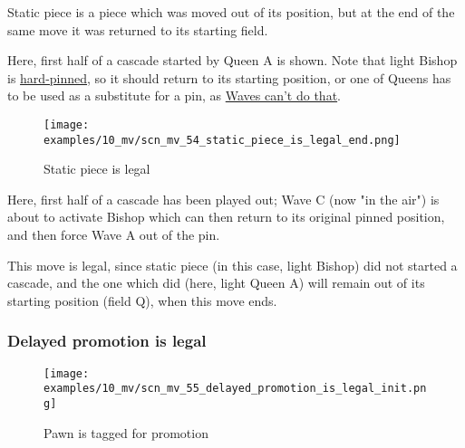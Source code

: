 \vspace*{-0.4\baselineskip}
Static piece is a piece which was moved out of its position, but at the end of the
same move it was returned to its starting field.

Here, first half of a cascade started by Queen A is shown. Note that light Bishop
is \href{https://en.wikipedia.org/wiki/Pin_(chess)#Absolute_pin}{hard-pinned}, so
it should return to its starting position, or one of Queens has to be used as a
substitute for a pin, as
\hyperref[fig:scn_mv_43_pinned_piece_cascaded_init]{Waves can't do that}.

\clearpage %

\vspace*{-2.1\baselineskip}
\noindent
\begin{figure}[!h]
\texttt{[image: examples/10\_mv/scn\_mv\_54\_static\_piece\_is\_legal\_end.png]}
\vspace*{-1.3\baselineskip}
\caption{Static piece is legal}
\label{fig:scn_mv_54_static_piece_is_legal_end}
\end{figure}

\vspace*{-0.4\baselineskip}
Here, first half of a cascade has been played out; Wave C (now "in the air") is
about to activate Bishop which can then return to its original pinned position,
and then force Wave A out of the pin.

This move is legal, since static piece (in this case, light Bishop) did not started
a cascade, and the one which did (here, light Queen A) will remain out of its
starting position (field Q), when this move ends.

\clearpage %

\subsubsection*{Delayed promotion is legal}
\label{sec:Miranda's veil/Wave/Cascading Waves/Delayed promotion is legal}

\noindent
\begin{figure}[!h]
\texttt{[image: examples/10\_mv/scn\_mv\_55\_delayed\_promotion\_is\_legal\_init.png]}
\caption{Pawn is tagged for promotion}
\label{fig:scn_mv_55_delayed_promotion_is_legal_init}
\end{figure}

